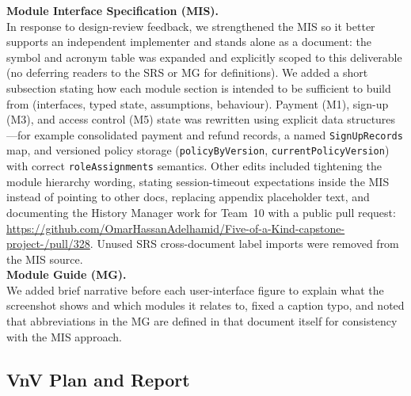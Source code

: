 \documentclass{article}
\begin{document}
\noindent
\textbf{Module Interface Specification (MIS).}\\
In response to design-review feedback, we strengthened the MIS so it better supports an independent implementer
 and stands alone as a document: the symbol and acronym table was expanded and explicitly scoped to this deliverable
  (no deferring readers to the SRS or MG for definitions).
We added a short subsection stating how each module section is intended to be sufficient to build from
 (interfaces, typed state, assumptions, behaviour).
Payment (M1), sign-up (M3), and access control (M5) state was rewritten using explicit data structures---for
 example consolidated payment and refund records, a named \texttt{SignUpRecords} map, and versioned policy
  storage (\texttt{policyByVersion}, \texttt{currentPolicyVersion}) with correct \texttt{roleAssignments} semantics.
Other edits included tightening the module hierarchy wording, stating session-timeout expectations inside
 the MIS instead of pointing to other docs, replacing appendix placeholder text, and documenting the History
  Manager work for Team~10 with a public pull request: \url{https://github.com/OmarHassanAdelhamid/Five-of-a-Kind-capstone-project-/pull/328}.
Unused SRS cross-document label imports were removed from the MIS source.\\

\noindent
\textbf{Module Guide (MG).}\\
We added brief narrative before each user-interface figure to explain what the screenshot shows and which modules it
 relates to, fixed a caption typo, and noted that abbreviations in the MG are defined in that document itself for
  consistency with the MIS approach.

\subsection{VnV Plan and Report}
\end{document}
